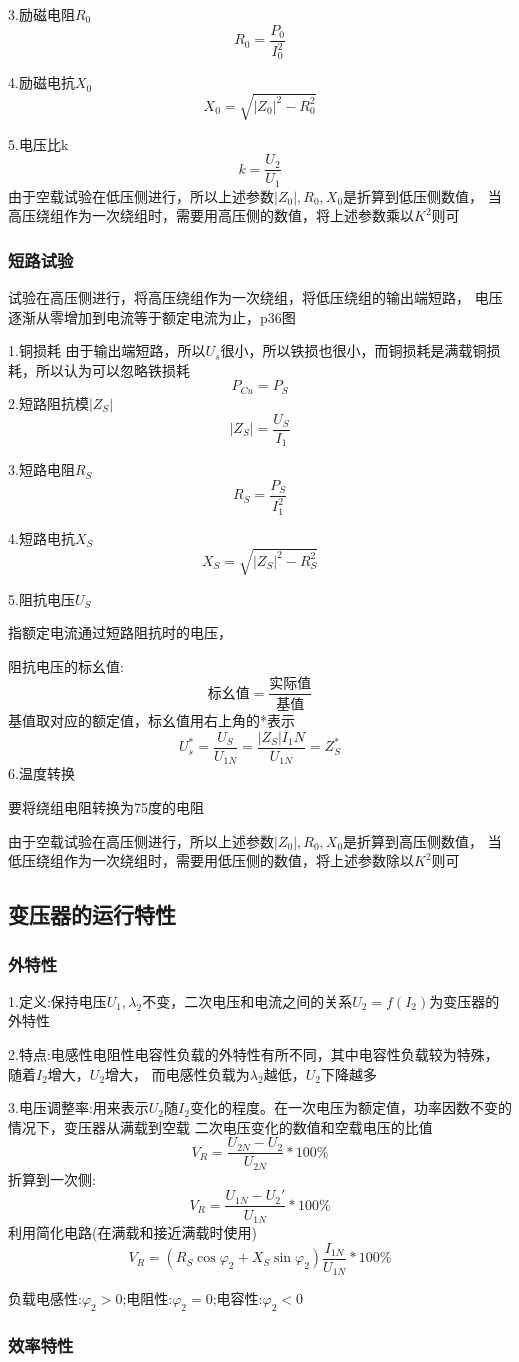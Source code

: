 \documentclass[11pt,twoside,a4paper]{ctexart}
\begin{document}
3.励磁电阻$R_0 $
\[R_0 = \frac{P_0}{I_0^2} \]

4.励磁电抗$ X_0 $
\[X_0 = \sqrt{|Z_0|^2 - R_0^2}\]

5.电压比k
\[k = \frac{U_2}{U_1}\]
由于空载试验在低压侧进行，所以上述参数$|Z_0|, R_0,X_0$是折算到低压侧数值，
当高压绕组作为一次绕组时，需要用高压侧的数值，将上述参数乘以$K^2 $则可
\subsubsection{短路试验}
试验在高压侧进行，将高压绕组作为一次绕组，将低压绕组的输出端短路，
电压逐渐从零增加到电流等于额定电流为止，p36图

1.铜损耗
由于输出端短路，所以$U_s$很小，所以铁损也很小，而铜损耗是满载铜损耗，所以认为可以忽略铁损耗
\[P_{Cu} = P_S \]
2.短路阻抗模$|Z_S| $
\[|Z_S| = \frac{U_S}{I_1}\]

3.短路电阻$R_S $
\[R_S = \frac{P_S}{I_1^2}\]

4.短路电抗$X_S $
\[X_S = \sqrt{|Z_S|^2 - R_S^2}\]

5.阻抗电压$U_S $

指额定电流通过短路阻抗时的电压，

阻抗电压的标幺值:
\[\text{标幺值} = \frac{\text{实际值}}{\text{基值}} \]
基值取对应的额定值，标幺值用右上角的*表示
\[U_s^* = \frac{U_S}{U_{1N}} = \frac{|Z_S|I_1N}{U_{1N}} = Z_S^*\]
6.温度转换

要将绕组电阻转换为75度的电阻

由于空载试验在高压侧进行，所以上述参数$|Z_0|, R_0,X_0$是折算到高压侧数值，
当低压绕组作为一次绕组时，需要用低压侧的数值，将上述参数除以$K^2 $则可
\subsection{变压器的运行特性}
\subsubsection{外特性}
1.定义:保持电压$U_1,\lambda _2$不变，二次电压和电流之间的关系$U_2 = f(I_2)$为变压器的外特性

2.特点:电感性电阻性电容性负载的外特性有所不同，其中电容性负载较为特殊，随着$I_2$增大，$U_2$增大，
而电感性负载为$\lambda _2 $越低，$U_2$下降越多

3.电压调整率:用来表示$U_2$随$I_2$变化的程度。在一次电压为额定值，功率因数不变的情况下，变压器从满载到空载
二次电压变化的数值和空载电压的比值
\[V_R = \frac{U_{2N} - U_2}{U_{2N}}*100\%\]
折算到一次侧:
\[V_R = \frac{U_{1N} - U_2'}{U_{1N}}*100\%\]
利用简化电路(在满载和接近满载时使用)
\[V_R = (R_S\cos\varphi _2 + X_S\sin\varphi _2)\frac{I_{1N}}{U_{1N}}*100\%\]

负载电感性:$\varphi _2 > 0$;电阻性:$\varphi _2 = 0$;电容性:$\varphi _2 < 0$
\subsubsection{效率特性}
\end{document}
